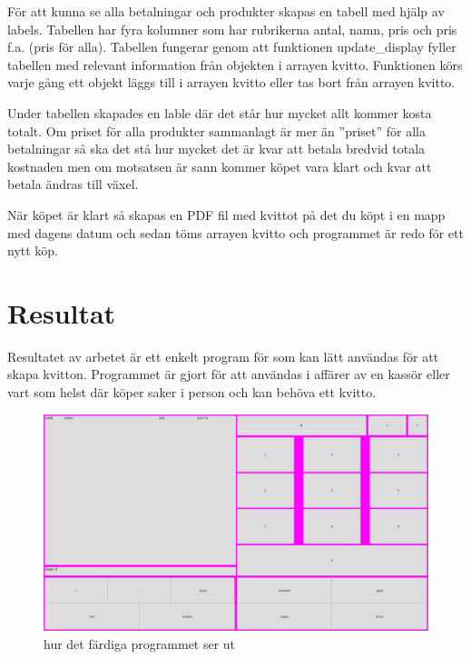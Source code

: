 \documentclass[a4paper, 12pt]{article}
\begin{document}
För att kunna se alla betalningar och produkter skapas en tabell med hjälp av labels. Tabellen har fyra kolumner som har rubrikerna antal, namn, pris och pris f.a. (pris för alla).
Tabellen fungerar genom att funktionen update\_display fyller tabellen med relevant information från objekten i arrayen kvitto. Funktionen körs varje gång ett objekt läggs till i arrayen kvitto eller tas bort från arrayen kvitto.


Under tabellen skapades en lable där det står hur mycket allt kommer kosta totalt. Om priset för alla produkter sammanlagt är mer än ''priset'' för alla betalningar så ska det stå hur mycket det är kvar att betala bredvid totala kostnaden men om motsatsen är sann kommer köpet vara klart och kvar att betala ändras till växel. 


När köpet är klart så skapas en PDF fil med kvittot på det du köpt i en mapp med dagens datum och sedan töms arrayen kvitto och programmet är redo för ett nytt köp.


\section{Resultat}

Resultatet av arbetet är ett enkelt program för som kan lätt användas för att skapa kvitton.
Programmet är gjort för att användas i affärer av en kassör eller vart som helst där köper saker i person och kan behöva ett kvitto.

\begin{figure}[h!]
  \includegraphics[width=\linewidth]{img/ferdig.png}
  \caption{ hur det färdiga programmet ser ut}
  \label{fig:färdig}
\end{figure}
\end{document}
